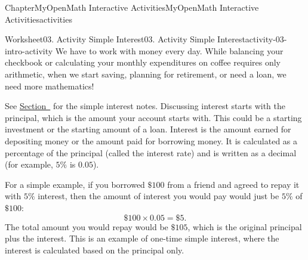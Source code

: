 \documentclass[oneside,10pt,]{book}
\newcommand{\blocktitlefont}{\relax}
\newcommand{\ptxlistdisc}{\raisebox{0.3ex}{\textbullet}}
\newlength{\fillinmaxwidth}
\newlength{\fillincontract}
\newlength{\charmaxwidth}\setlength{\charmaxwidth}{0.5em}
\newlength{\charminwidth}\setlength{\charminwidth}{0.1em}
\newlength{\fillinheight}
\newcommand{\fillintext}[1]{%
\setlength{\fillinmaxwidth}{#1\charmaxwidth}%
\setlength{\fillincontract}{#1\charminwidth}%
\setlength{\fillinheight}{\baselineskip}\addtolength{\fillinheight}{1.2pt}%
\strut\nobreak\leaders\vbox{\hrule width 0.3pt height 0.3pt \vskip -1.2pt}\hskip 1\fillinmaxwidth minus \fillincontract\nobreak\strut%
}
\begin{document}
\begin{chapterptx}{Chapter}{MyOpenMath Interactive Activities}{}{MyOpenMath Interactive Activities}{}{}{activities}
\begin{worksheet-section}{Worksheet}{03. Activity Simple Interest}{}{03. Activity Simple Interest}{}{}{activity-03-intro-activity}
We have to work with money every day. While balancing your checkbook or calculating your monthly expenditures on coffee requires only arithmetic, when we start saving, planning for retirement, or need a loan, we need more mathematics!%
 \par
See \hyperref[notes-simple-interest]{Section~} for the simple interest notes.%
Discussing interest starts with the principal, which is the amount your account starts with. This could be a starting investment or the starting amount of a loan. Interest is the amount earned for depositing money or the amount paid for borrowing money. It is calculated as a percentage of the principal (called the interest rate) and is written as a decimal (for example, \(5\%\) is \(0.05\)).%
\par
For a simple example, if you borrowed \(\$100\) from a friend and agreed to repay it with \(5\%\) interest, then the amount of interest you would pay would just be \(5\%\) of \(\$100\):%
\begin{equation*}
\$100 \times 0.05 = \$5\text{.}
\end{equation*}
The total amount you would repay would be \(\$105\), which is the original principal plus the interest. This is an example of one-time simple interest, where the interest is calculated based on the principal only.%
\end{worksheet-section}
\end{chapterptx}
\end{document}
